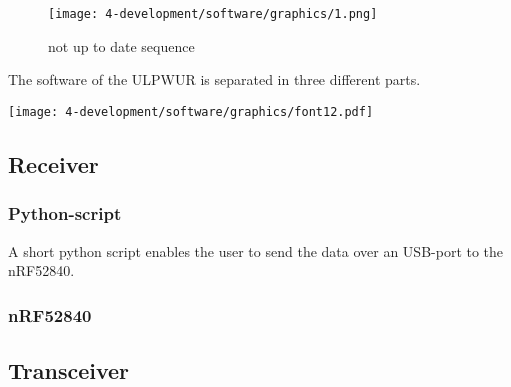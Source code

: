 \begin{figure}[ht]
	\centering
	\texttt{[image: 4-development/software/graphics/1.png]}
	\caption{not up to date sequence\label{software:sequence}}
\end{figure}

The software of the ULPWUR is separated in three different parts. 

\texttt{[image: 4-development/software/graphics/font12.pdf]}

\subsection{Receiver}

\subsubsection{Python-script}
\lstset{basicstyle=\footnotesize}
\lstset{style=mystyle}

A short python script enables the user to send the data over an USB-port to the nRF52840.

%

\subsubsection{nRF52840}


\subsection{Transceiver}